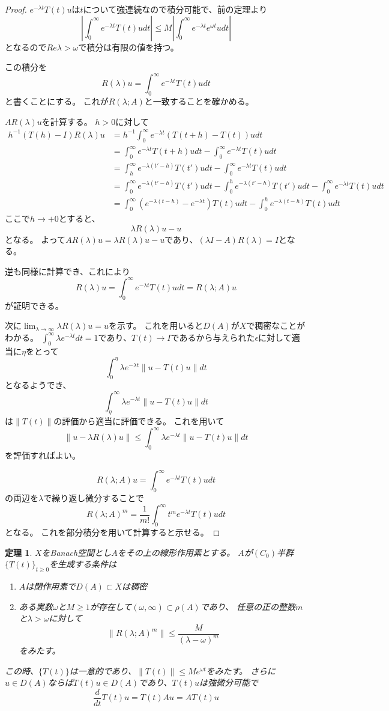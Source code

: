 \documentclass{jsarticle}
\newtheorem{thm}{定理}
\newcommand{\abs}[1]{|#1|}
\newcommand{\norm}[1]{\|#1\|}
\begin{document}
\begin{proof}
$e^{-\lambda t}T(t)u$は$t$について強連続なので積分可能で、前の定理より
\[
\abs{\int^\infty_0e^{-\lambda t}T(t)udt}\leq M\abs{\int^\infty_0e^{-\lambda t}e^{\omega t}udt}
\]
となるので$Re\lambda>\omega$で積分は有限の値を持つ。

この積分を
\[
R(\lambda)u=\int^\infty_0e^{-\lambda t}T(t)udt
\]
と書くことにする。
これが$R(\lambda;A)$と一致することを確かめる。

$AR(\lambda)u$を計算する。
$h>0$に対して
\begin{align*}
h^{-1}(T(h)-I)R(\lambda)u
&=h^{-1}\int^\infty_0e^{-\lambda t}(T(t+h)-T(t))udt\\
&=\int^\infty_0e^{-\lambda t}T(t+h)udt-\int^\infty_0e^{-\lambda t}T(t)udt\\
&=\int^\infty_he^{-\lambda(t'-h)}T(t')udt-\int^\infty_0e^{-\lambda t}T(t)udt\\
&=\int^\infty_0e^{-\lambda(t'-h)}T(t')udt-\int^h_0e^{-\lambda(t'-h)}T(t')udt-\int^\infty_0e^{-\lambda t}T(t)udt\\
&=\int^\infty_0(e^{-\lambda(t-h)}-e^{-\lambda t})T(t)udt-\int^h_0e^{-\lambda(t-h)}T(t)udt
\end{align*}
ここで$h\to +0$とすると、
\[
\lambda R(\lambda)u-u
\]
となる。
よって$AR(\lambda)u=\lambda R(\lambda)u-u$であり、$(\lambda I-A)R(\lambda)=I$となる。

逆も同様に計算でき、これにより
\[
R(\lambda)u=\int^\infty_0e^{-\lambda t}T(t)udt=R(\lambda;A)u
\]
が証明できる。

次に$\lim_{\lambda\to\infty}\lambda R(\lambda)u=u$を示す。
これを用いると$D(A)$が$X$で稠密なことがわかる。
$\int^\infty_0\lambda e^{-\lambda t}dt=1$であり、$T(t)\to I$であるから与えられた$\epsilon$に対して適当に$\eta$をとって
\[
\int^\eta_0\lambda e^{-\lambda t}\norm{u-T(t)u}dt
\]
となるようでき、
\[
\int^\infty_\eta\lambda e^{-\lambda t}\norm{u-T(t)u}dt
\]
は$\norm{T(t)}$の評価から適当に評価できる。
これを用いて
\[
\norm{u-\lambda R(\lambda)u}\leq\int^\infty_0\lambda e^{-\lambda t}\norm{u-T(t)u}dt
\]
を評価すればよい。

\[
R(\lambda;A)u=\int^\infty_0e^{-\lambda t}T(t)udt
\]
の両辺を$\lambda$で繰り返し微分することで
\[
R(\lambda;A)^m=\frac{1}{m!}\int^\infty_0t^me^{-\lambda t}T(t)udt
\]
となる。
これを部分積分を用いて計算すると示せる。
\end{proof}

\begin{thm}
$X$をBanach空間とし$A$をその上の線形作用素とする。
$A$が$(C_0)$半群$\{T(t)\}_{t\geq0}$を生成する条件は
\begin{enumerate}
\item $A$は閉作用素で$D(A)\subset X$は稠密
\item ある実数$\omega$と$M\geq1$が存在して$(\omega,\infty)\subset\rho(A)$であり、
任意の正の整数$m$と$\lambda>\omega$に対して
\[
\norm{R(\lambda;A)^m}\leq\frac{M}{(\lambda-\omega)^m}
\]
をみたす。
\end{enumerate}

この時、$\{T(t)\}$は一意的であり、$\norm{T(t)}\leq Me^{\omega t}$をみたす。
さらに$u\in D(A)$ならば$T(t)u\in D(A)$であり、$T(t)u$は強微分可能で
\[
\frac{d}{dt}T(t)u=T(t)Au=AT(t)u
\]
\end{thm}
\end{document}
